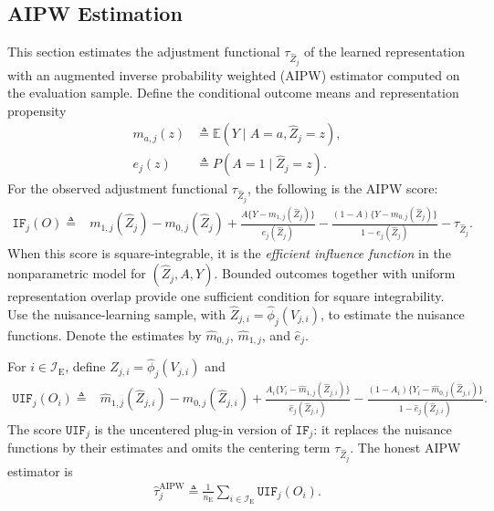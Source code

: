 \subsection{AIPW Estimation}
\label{sec:aipw-estimation}
This section estimates the adjustment functional $\tau_{\widehat Z_j}$ of the learned representation with an augmented inverse probability weighted (AIPW) estimator \citep{robins1994estimation,tsiatis2006semiparametric} computed on the evaluation sample.
 Define the conditional outcome means and representation propensity
\begin{align}\label{eq:aipw-nuisances}
	m_{a,j}(z) &\triangleq \mathbb E(Y\mid A=a,\widehat Z_j=z),\\
	e_j(z) &\triangleq P(A=1\mid\widehat Z_j=z).
\end{align}
For the observed adjustment functional $\tau_{\widehat Z_j}$, the following is the AIPW score:
\begin{align}\label{eq:fixed-representation-eif}
	\mathtt{IF}_j(O) \triangleq & m_{1,j}(\widehat Z_j)-m_{0,j}(\widehat Z_j) +
	\frac{A\{Y-m_{1,j}(\widehat Z_j)\}}{e_j(\widehat Z_j)}
	-
	\frac{(1-A)\{Y-m_{0,j}(\widehat Z_j)\}}{1-e_j(\widehat Z_j)}
	-
	\tau_{\widehat Z_j}.
\end{align}
When this score is square-integrable, it is the \textit{efficient influence function} in the nonparametric model for $(\widehat Z_j,A,Y)$. Bounded outcomes together with uniform representation overlap provide one sufficient condition for square integrability. Use the nuisance-learning sample, with $\widehat Z_{j,i}=\widehat\phi_j(V_{j,i})$, to estimate the nuisance functions. Denote the estimates by $\widehat m_{0,j}$, $\widehat m_{1,j}$, and $\widehat e_j$.

\begin{definition}
\label{def:honest-aipw}
\normalfont
For $i\in\mathcal I_{\mathrm E}$, define $\widehat Z_{j,i}=\widehat\phi_j(V_{j,i})$ and
\begin{align}\label{eq:aipw-score}
	\mathtt{UIF}_j(O_i) \triangleq{}&
	\widehat m_{1,j}(\widehat Z_{j,i})
	-
	\widehat m_{0,j}(\widehat Z_{j,i})
	+
	\frac{A_i\{Y_i-\widehat m_{1,j}(\widehat Z_{j,i})\}}
	{\widehat e_j(\widehat Z_{j,i})}
	-
	\frac{(1-A_i)\{Y_i-\widehat m_{0,j}(\widehat Z_{j,i})\}}
	{1-\widehat e_j(\widehat Z_{j,i})}.
\end{align}
The score $\mathtt{UIF}_j$ is the uncentered plug-in version of $\mathtt{IF}_j$: it replaces the nuisance functions by their estimates and omits the centering term $\tau_{\widehat Z_j}$.
The honest AIPW estimator is
\begin{align}\label{eq:honest-aipw}
	\widehat\tau_j^{\mathrm{AIPW}} \triangleq \frac{1}{n_{\mathrm E}} \sum_{i\in\mathcal I_{\mathrm E}}\mathtt{UIF}_j(O_i).
\end{align}
\end{definition}

